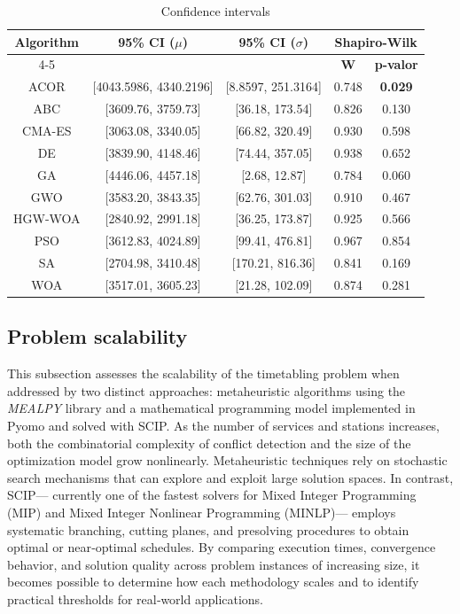 \documentclass[Afour,sagev,times]{sagej}
\begin{document}
\begin{table}[ht]
\centering
\caption{Confidence intervals}
\label{tab:confidence_intervals}
\begin{tabular}{|c|c|c|c|c|}
\hline
\multirow{2}{*}{\textbf{Algorithm}} & \multirow{2}{*}{\textbf{95\% CI ($\mu$)}} & \multirow{2}{*}{\textbf{95\% CI ($\sigma$)}} & \multicolumn{2}{c|}{\textbf{Shapiro-Wilk}} \\
\cline{4-5} 
& & & \textbf{W} & \textbf{p-valor} \\ \hline \hline
ACOR & [4043.5986, 4340.2196] & [8.8597, 251.3164] & 0.748 & \textbf{0.029} \\
ABC & [3609.76, 3759.73] & [36.18, 173.54] & 0.826 & 0.130 \\
CMA-ES & [3063.08, 3340.05] & [66.82, 320.49] & 0.930 & 0.598 \\
DE & [3839.90, 4148.46] & [74.44, 357.05] & 0.938 & 0.652 \\
GA & [4446.06, 4457.18] & [2.68, 12.87] & 0.784 & 0.060 \\
GWO & [3583.20, 3843.35] & [62.76, 301.03] & 0.910 & 0.467 \\
HGW-WOA & [2840.92, 2991.18] & [36.25, 173.87] & 0.925 & 0.566 \\
PSO & [3612.83, 4024.89] & [99.41, 476.81] & 0.967 & 0.854 \\
SA & [2704.98, 3410.48] & [170.21, 816.36] & 0.841 & 0.169 \\
WOA & [3517.01, 3605.23] & [21.28, 102.09] & 0.874 & 0.281 \\ \hline
\end{tabular}
\end{table}

\subsection{Problem scalability}
\label{sec:problem_scalability}

This subsection assesses the scalability of the timetabling problem when addressed by two distinct approaches: metaheuristic algorithms using the \textit{MEALPY} library and a mathematical programming model implemented in Pyomo and solved with \gls{SCIP}. As the number of services and stations increases, both the combinatorial complexity of conflict detection and the size of the optimization model grow nonlinearly. Metaheuristic techniques rely on stochastic search mechanisms that can explore and exploit large solution spaces. In contrast, SCIP— currently one of the fastest solvers for Mixed Integer Programming (MIP) and Mixed Integer Nonlinear Programming (MINLP)— employs systematic branching, cutting planes, and presolving procedures to obtain optimal or near‐optimal schedules. By comparing execution times, convergence behavior, and solution quality across problem instances of increasing size, it becomes possible to determine how each methodology scales and to identify practical thresholds for real‐world applications.
\end{document}
